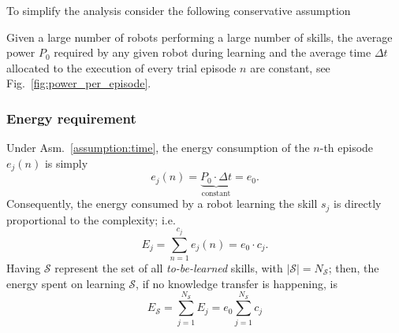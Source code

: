 To simplify the analysis consider the following conservative assumption
\begin{tcolorbox}
	\begin{assumption}\label{assumption:time}
		Given a large number of robots performing a large number of skills, the average power $P_0$ required by any given robot during learning and the average time $\Delta t$ allocated to the execution of every trial episode $n$ are constant, see Fig.~\ref{fig:power_per_episode}.
	\end{assumption}
\end{tcolorbox}
\subsubsection{\textbf{Energy requirement}}
Under Asm.~\ref{assumption:time}, the energy consumption of the $n$-th episode $e_j(n)$ is simply
\begin{equation}\label{eq:energy_per_episode}
    e_j(n) = \underbrace{P_0\cdot \Delta t}_{\text{constant}} = e_0.
\end{equation}
Consequently, the energy consumed by a robot learning the skill $ s_j $ is directly proportional to the complexity; i.e.
\begin{equation}\label{eq:energy_per_skill}
    E_j =\sum_{n=1}^{c_j} e_j(n) = e_0 \cdot c_j.
\end{equation}
Having $\mathcal{S}$ represent the set of all \emph{to-be-learned} skills, with $|\mathcal{S}| = N_\mathcal{S}$; then, the energy spent on learning $\mathcal{S}$, if no knowledge transfer is happening, is
\begin{equation}\label{eq:total_energy}
	E_{\mathcal{S}} = \sum_{j=1}^{{N_{\mathcal{S}}}} E_j = e_0 \sum_{j=1}^{{N_{\mathcal{S}}}} c_j%
\end{equation}
